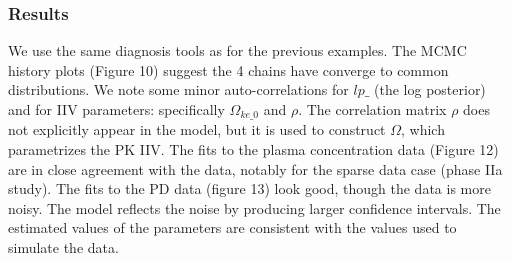 \documentclass[11pt]{amsart}
\begin{document}
\subsubsection*{Results} We use the same diagnosis tools as for the previous examples. The MCMC history plots (Figure 10) suggest the 4 chains have converge to common distributions. We note some minor auto-correlations for $lp\_$ (the log posterior) and for IIV parameters: specifically $\Omega_{ke\_0}$ and $\rho$. The correlation matrix $\rho$ does not explicitly appear in the model, but it is used to construct $\Omega$, which parametrizes the PK IIV. The fits to the plasma concentration data (Figure 12) are in close agreement with the data, notably for the sparse data case (phase IIa study). The fits to the PD data (figure 13) look good, though the data is more noisy. The model reflects the noise by producing larger confidence intervals. The estimated values of the parameters are consistent with the values used to simulate the data. 
\end{document}
